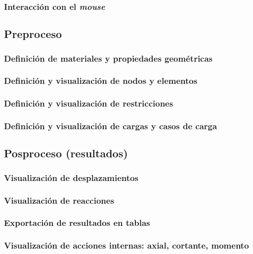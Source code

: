 \subsubsection{Interacción con el \textit{mouse}}


\subsection{Preproceso}

\subsubsection{Definición de materiales y propiedades geométricas}

\subsubsection{Definición y visualización de nodos y elementos}

\subsubsection{Definición y visualización de restricciones}

\subsubsection{Definición y visualización de cargas y casos de carga}


\subsection{Posproceso (resultados)}

\subsubsection{Visualización de desplazamientos}

\subsubsection{Visualización de reacciones}

\subsubsection{Exportación de resultados en tablas}

\subsubsection{Visualización de acciones internas: axial, cortante, momento}

